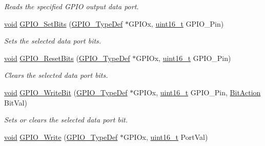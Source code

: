 \begin{DoxyCompactItemize}
\begin{DoxyCompactList}\small\item\em Reads the specified G\+P\+IO output data port. \end{DoxyCompactList}\item 
\hyperlink{usb__devapi_8h_afabf60e7f57651d6d595a02c75f07cd0}{void} \hyperlink{group___g_p_i_o___private___functions_ga9e1352eed7c6620e18af2d86f6b6ff8e}{G\+P\+I\+O\+\_\+\+Set\+Bits} (\hyperlink{struct_g_p_i_o___type_def}{G\+P\+I\+O\+\_\+\+Type\+Def} $\ast$G\+P\+I\+Ox, \hyperlink{_p_e___types_8h_a1f1825b69244eb3ad2c7165ddc99c956}{uint16\+\_\+t} G\+P\+I\+O\+\_\+\+Pin)
\begin{DoxyCompactList}\small\item\em Sets the selected data port bits. \end{DoxyCompactList}\item 
\hyperlink{usb__devapi_8h_afabf60e7f57651d6d595a02c75f07cd0}{void} \hyperlink{group___g_p_i_o___private___functions_ga6fcd35b207a66608dd2c9d7de9247dc8}{G\+P\+I\+O\+\_\+\+Reset\+Bits} (\hyperlink{struct_g_p_i_o___type_def}{G\+P\+I\+O\+\_\+\+Type\+Def} $\ast$G\+P\+I\+Ox, \hyperlink{_p_e___types_8h_a1f1825b69244eb3ad2c7165ddc99c956}{uint16\+\_\+t} G\+P\+I\+O\+\_\+\+Pin)
\begin{DoxyCompactList}\small\item\em Clears the selected data port bits. \end{DoxyCompactList}\item 
\hyperlink{usb__devapi_8h_afabf60e7f57651d6d595a02c75f07cd0}{void} \hyperlink{group___g_p_i_o___private___functions_ga8f7b237fd744d9f7456fbe0da47a9b80}{G\+P\+I\+O\+\_\+\+Write\+Bit} (\hyperlink{struct_g_p_i_o___type_def}{G\+P\+I\+O\+\_\+\+Type\+Def} $\ast$G\+P\+I\+Ox, \hyperlink{_p_e___types_8h_a1f1825b69244eb3ad2c7165ddc99c956}{uint16\+\_\+t} G\+P\+I\+O\+\_\+\+Pin, \hyperlink{agilefox_2library_2inc_2stm32f10x__gpio_8h_a176130b21c0e719121470a6042d4cf19}{Bit\+Action} Bit\+Val)
\begin{DoxyCompactList}\small\item\em Sets or clears the selected data port bit. \end{DoxyCompactList}\item 
\hyperlink{usb__devapi_8h_afabf60e7f57651d6d595a02c75f07cd0}{void} \hyperlink{group___g_p_i_o___private___functions_gaa925f19c8547a00c7a0c269a84873bf9}{G\+P\+I\+O\+\_\+\+Write} (\hyperlink{struct_g_p_i_o___type_def}{G\+P\+I\+O\+\_\+\+Type\+Def} $\ast$G\+P\+I\+Ox, \hyperlink{_p_e___types_8h_a1f1825b69244eb3ad2c7165ddc99c956}{uint16\+\_\+t} Port\+Val)

\end{DoxyCompactItemize}
